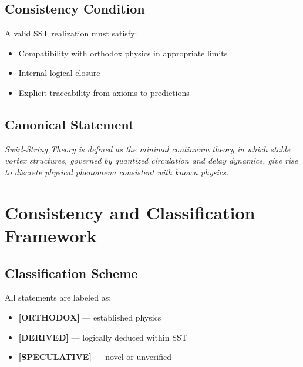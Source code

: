 \documentclass[11pt]{article}
\theoremstyle{definition}
\theoremstyle{plain}
\theoremstyle{remark}
\begin{document}
    \subsection{Consistency Condition}
        
        A valid SST realization must satisfy:
        
        \begin{itemize}
            \item Compatibility with orthodox physics in appropriate limits
            \item Internal logical closure
            \item Explicit traceability from axioms to predictions
        \end{itemize}
    
    \subsection{Canonical Statement}
        
        \begin{center}
            \textit{
                Swirl-String Theory is defined as the minimal continuum theory in which stable vortex structures, governed by quantized circulation and delay dynamics, give rise to discrete physical phenomena consistent with known physics.
            }
        \end{center}

        
\section{Consistency and Classification Framework}
    \label{sec:consistency}
    
    \subsection{Classification Scheme}
        
        All statements are labeled as:
        
        \begin{itemize}
            \item \textbf{[ORTHODOX]} — established physics
            \item \textbf{[DERIVED]} — logically deduced within SST
            \item \textbf{[SPECULATIVE]} — novel or unverified
        \end{itemize}
\end{document}
